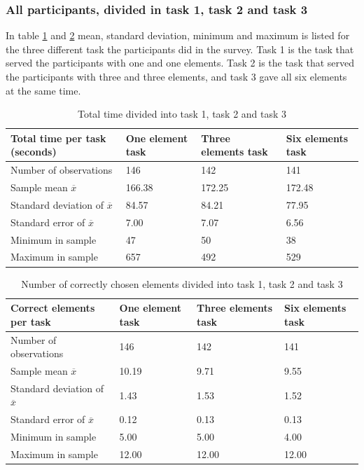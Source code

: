 \subsubsection{All participants, divided in task 1, task 2 and task 3}\label{sec:taskdivided_all}

In table \ref{tab:totaltime_tasks} and \ref{tab:totalcorrect_tasks} mean, standard deviation, minimum and maximum is listed for the three different task the participants did in the survey. Task 1 is the task that served the participants with one and one elements. Task 2 is the task that served the participants with three and three elements, and task 3 gave all six elements at the same time. 

\begin{table}[H]
	\centering
	\begin{tabular}{l|l|l|l}
		Total time per task (seconds) & One element task & Three elements task & Six elements task \\ \hline
		Number of observations & 146    & 142      & 141     \\
		Sample mean $\overline{x}$  & 166.38  &  172.25   &   172.48  \\
		Standard deviation of $\overline{x}$   & 84.57  & 84.21  & 77.95   \\
		Standard error of $\overline{x}$   & 7.00 & 7.07 & 6.56 \\
		Minimum in sample    & 47  & 50 &   38   \\
		Maximum in sample   & 657 & 492  & 529 \\ \hline
	\end{tabular}
	\caption[Total time, divided into task 1, 2 and 3]{Total time divided into task 1, task 2 and task 3}
	\label{tab:totaltime_tasks}
\end{table}

\begin{table}[H]
	\centering
	\begin{tabular}{l|l|l|l}
		Correct elements per task & One element task & Three elements task & Six elements task \\ \hline
		Number of observations & 146    & 142     & 141        \\
		Sample mean $\overline{x}$ & 10.19  &  9.71  &   9.55   \\
		Standard deviation of $\overline{x}$ & 1.43  & 1.53 & 1.52    \\
		Standard error of $\overline{x}$ & 0.12 &  0.13 & 0.13  \\
		Minimum in sample  & 5.00  & 5.00  &   4.00  \\
		Maximum in sample  & 12.00 & 12.00  & 12.00 \\ \hline
	\end{tabular}
	\caption[Correct elements, divided into task 1, task 2 and task 3]{Number of correctly chosen elements divided into task 1, task 2 and task 3}
	\label{tab:totalcorrect_tasks}
\end{table}

